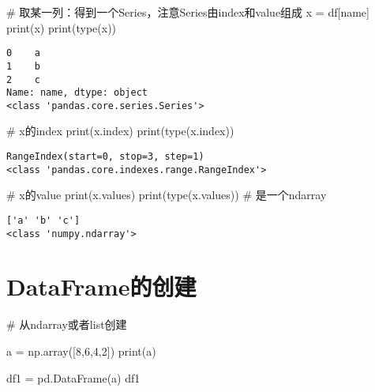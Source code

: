 \documentclass[
  letterpaper,
  DIV=11,
  numbers=noendperiod]{scrreprt}
\newenvironment{Shaded}{\begin{snugshade}}{\end{snugshade}}
\newcommand{\BuiltInTok}[1]{\textcolor[rgb]{0.00,0.23,0.31}{#1}}
\newcommand{\CommentTok}[1]{\textcolor[rgb]{0.37,0.37,0.37}{#1}}
\newcommand{\DecValTok}[1]{\textcolor[rgb]{0.68,0.00,0.00}{#1}}
\newcommand{\NormalTok}[1]{\textcolor[rgb]{0.00,0.23,0.31}{#1}}
\newcommand{\OperatorTok}[1]{\textcolor[rgb]{0.37,0.37,0.37}{#1}}
\newcommand{\StringTok}[1]{\textcolor[rgb]{0.13,0.47,0.30}{#1}}
\begin{document}
\begin{Shaded}
\begin{Highlighting}[]
\CommentTok{\# 取某一列：得到一个Series，注意Series由index和value组成}
\NormalTok{x }\OperatorTok{=}\NormalTok{ df[}\StringTok{\textquotesingle{}name\textquotesingle{}}\NormalTok{]}
\BuiltInTok{print}\NormalTok{(x)}
\BuiltInTok{print}\NormalTok{(}\BuiltInTok{type}\NormalTok{(x))}
\end{Highlighting}
\end{Shaded}

\begin{verbatim}
0    a
1    b
2    c
Name: name, dtype: object
<class 'pandas.core.series.Series'>
\end{verbatim}

\begin{Shaded}
\begin{Highlighting}[]
\CommentTok{\# x的index}
\BuiltInTok{print}\NormalTok{(x.index)}
\BuiltInTok{print}\NormalTok{(}\BuiltInTok{type}\NormalTok{(x.index))}
\end{Highlighting}
\end{Shaded}

\begin{verbatim}
RangeIndex(start=0, stop=3, step=1)
<class 'pandas.core.indexes.range.RangeIndex'>
\end{verbatim}

\begin{Shaded}
\begin{Highlighting}[]
\CommentTok{\# x的value}
\BuiltInTok{print}\NormalTok{(x.values)}
\BuiltInTok{print}\NormalTok{(}\BuiltInTok{type}\NormalTok{(x.values)) }\CommentTok{\# 是一个ndarray}
\end{Highlighting}
\end{Shaded}

\begin{verbatim}
['a' 'b' 'c']
<class 'numpy.ndarray'>
\end{verbatim}

\hypertarget{dataframeux7684ux521bux5efa}{%
\section{DataFrame的创建}\label{dataframeux7684ux521bux5efa}}

\begin{Shaded}
\begin{Highlighting}[]
\CommentTok{\# 从ndarray或者list创建}

\NormalTok{a }\OperatorTok{=}\NormalTok{ np.array([}\DecValTok{8}\NormalTok{,}\DecValTok{6}\NormalTok{,}\DecValTok{4}\NormalTok{,}\DecValTok{2}\NormalTok{])}
\BuiltInTok{print}\NormalTok{(a)}

\NormalTok{df1 }\OperatorTok{=}\NormalTok{ pd.DataFrame(a)}
\NormalTok{df1}
\end{Highlighting}
\end{Shaded}
\end{document}
